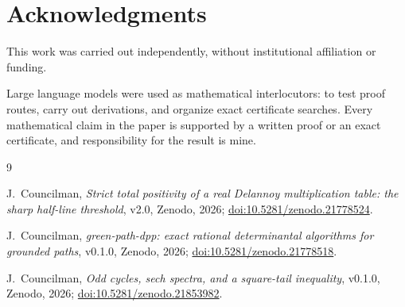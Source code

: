 \documentclass[11pt,a4paper]{article}
\theoremstyle{plain}
\theoremstyle{remark}
\begin{document}
\section*{Acknowledgments}

This work was carried out independently, without institutional affiliation or
funding.

Large language models were used as mathematical interlocutors: to test proof
routes, carry out derivations, and organize exact certificate searches.  Every
mathematical claim in the paper is supported by a written proof or an exact
certificate, and responsibility for the result is mine.

\begin{thebibliography}{9}

J.~Councilman,
\emph{Strict total positivity of a real Delannoy multiplication table: the
sharp half-line threshold}, v2.0, Zenodo, 2026;
\href{https://doi.org/10.5281/zenodo.21778524}{doi:10.5281/zenodo.21778524}.

J.~Councilman,
\emph{green-path-dpp: exact rational determinantal algorithms for grounded
paths}, v0.1.0, Zenodo, 2026;
\href{https://doi.org/10.5281/zenodo.21778518}{doi:10.5281/zenodo.21778518}.

J.~Councilman,
\emph{Odd cycles, sech spectra, and a square-tail inequality}, v0.1.0,
Zenodo, 2026;
\href{https://doi.org/10.5281/zenodo.21853982}{doi:10.5281/zenodo.21853982}.

\end{thebibliography}
\end{document}
